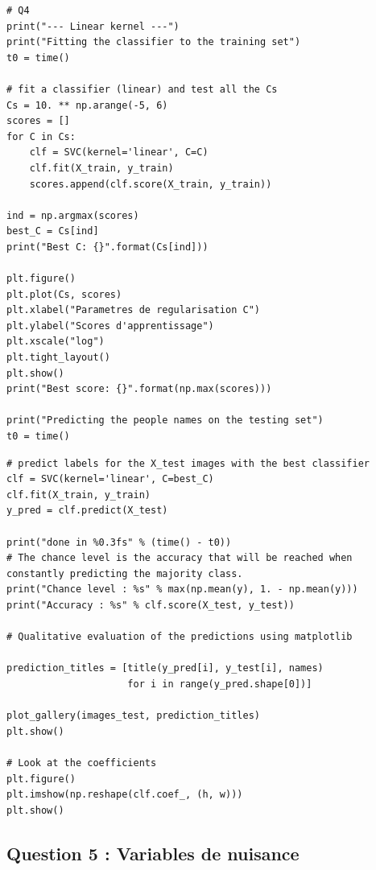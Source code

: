 \documentclass{article}
\begin{document}
\begin{lstlisting}
# Q4
print("--- Linear kernel ---")
print("Fitting the classifier to the training set")
t0 = time()

# fit a classifier (linear) and test all the Cs
Cs = 10. ** np.arange(-5, 6)
scores = []
for C in Cs:
    clf = SVC(kernel='linear', C=C)
    clf.fit(X_train, y_train)
    scores.append(clf.score(X_train, y_train)) 

ind = np.argmax(scores)
best_C = Cs[ind]
print("Best C: {}".format(Cs[ind]))

plt.figure()
plt.plot(Cs, scores)
plt.xlabel("Parametres de regularisation C")
plt.ylabel("Scores d'apprentissage")
plt.xscale("log")
plt.tight_layout()
plt.show()
print("Best score: {}".format(np.max(scores)))

print("Predicting the people names on the testing set")
t0 = time()
\end{lstlisting}

\begin{lstlisting}
# predict labels for the X_test images with the best classifier
clf = SVC(kernel='linear', C=best_C)
clf.fit(X_train, y_train)
y_pred = clf.predict(X_test)
    
print("done in %0.3fs" % (time() - t0))
# The chance level is the accuracy that will be reached when constantly predicting the majority class.
print("Chance level : %s" % max(np.mean(y), 1. - np.mean(y)))
print("Accuracy : %s" % clf.score(X_test, y_test))
    
# Qualitative evaluation of the predictions using matplotlib
    
prediction_titles = [title(y_pred[i], y_test[i], names)
                     for i in range(y_pred.shape[0])]
    
plot_gallery(images_test, prediction_titles)
plt.show()

# Look at the coefficients
plt.figure()
plt.imshow(np.reshape(clf.coef_, (h, w)))
plt.show()
\end{lstlisting}

\subsection*{Question 5 : Variables de nuisance}
\end{document}
